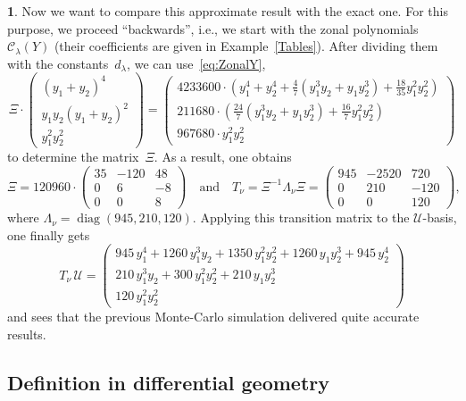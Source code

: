 \documentclass{mathincs}
\numberwithin{equation}{section}
\numberwithin{figure}{section}
\theoremstyle{plain}
\theoremstyle{definition}
\theoremstyle{remark}
\theoremstyle{plain}
\theoremstyle{definition}
\newtheorem{example}[thm]{\protect\examplename}
\theoremstyle{plain}
\theoremstyle{plain}
\DeclareMathOperator{\diag}{diag}
\providecommand{\examplename}{Example}
\begin{document}
\begin{example}
  Now we want to compare this approximate result with the exact one.  For this
  purpose, we proceed ``backwards'', i.e., we start with the zonal polynomials
  $\mathcal{C}_\lambda(Y)$ (their coefficients are given in
  Example~\ref{Tables}).  After dividing them with the constants~$d_\lambda$,
  we can use~\eqref{eq:ZonalY},
  \[
    \Xi \cdot \begin{pmatrix} (y_1+y_2)^4 \\ y_1y_2(y_1+y_2)^2 \\ y_1^2y_2^2 \end{pmatrix} =
    \begin{pmatrix}
      4233600 \cdot \left(y_1^4+y_2^4 + \frac{4}{7}(y_1^3y_2+y_1y_2^3) + \frac{18}{35}y_1^2y_2^2 \right) \\
      211680 \cdot \left(\frac{24}{7}(y_1^3y_2+y_1y_2^3) + \frac{16}{7}y_1^2y_2^2\right) \\
      967680 \cdot y_1^2 y_2^2
    \end{pmatrix}
  \]
  to determine the matrix~$\Xi$. As a result, one obtains
  \[
    \Xi = 120960 \cdot
    \begin{pmatrix}
      35 & -120 & 48 \\
      0 & 6 & -8 \\
      0 & 0 & 8
    \end{pmatrix}
    \quad\text{and}\quad
    T_\nu = \Xi^{-1}\Lambda_{\nu}\Xi =
    \begin{pmatrix}
       945 & -2520 & 720 \\
       0 & 210 & -120 \\
       0 & 0 & 120
    \end{pmatrix},
  \]
  where $\Lambda_{\nu}=\diag(945,210,120)$. Applying this transition matrix
  to the $\mathcal{U}$-basis, one finally gets
  \[
    T_\nu \, \mathcal{U} =
    \begin{pmatrix}
      945\,y_1^4 + 1260\,y_1^3y_2 + 1350\,y_1^2y_2^2 + 1260\,y_1y_2^3 + 945\,y_2^4 \\
      210\,y_1^3y_2 + 300\,y_1^2y_2^2 + 210\,y_1y_2^3 \\
      120\,y_1^2y_2^2
    \end{pmatrix}
  \]
  and sees that the previous Monte-Carlo simulation delivered quite
  accurate results.
\end{example}


\subsection{Definition in differential geometry}
\end{document}
